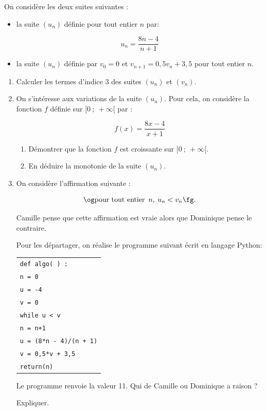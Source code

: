 \medskip

On considère les deux suites suivantes :

\setlength\parindent{9mm}
\begin{itemize}
\item[$\bullet~~$]la suite $\left(u_n\right)$ définie pour tout entier $n$ par:

\[u_n =  \dfrac{8n-4}{n+1}\]

\item[$\bullet~~$]la suite $\left(u_n\right)$ définie par $v_0 = 0$ et $v_{n+1} = 0,5v_n +3,5$ pour tout entier $n$.
\end{itemize}
\setlength\parindent{0mm}

\medskip

\begin{enumerate}
\item Calculer les termes d'indice 3 des suites $\left(u_n\right)$ et $\left(v_n\right)$.
\item On s'intéresse aux variations de la suite $\left(u_n\right)$.
 Pour cela, on considère la fonction $f$ définie sur $[0~;~+ \infty[$ par :
 
 \[f(x) = \dfrac{8x- 4}{x + 1}\]
 
	\begin{enumerate}
		\item Démontrer que la fonction $f$ est croissante sur $[0~;~+ \infty[$.
		\item En déduire la monotonie de la suite $\left(u_n\right)$.
	\end{enumerate} 
\item On considère l'affirmation suivante :

\[\og \text{pour tout entier }\, n,\: u_n < v_n \fg.\]

Camille pense que cette affirmation est vraie alors que Dominique pense le contraire.

Pour les départager, on réalise le programme suivant écrit en langage Python:

\begin{center}
\begin{tabularx}{0.5\linewidth}{|X|}\hline
\quad \texttt{def algo( )  :}\\
\quad \texttt{n = 0}\\
\quad \texttt{u = -4}\\
\quad \texttt{v = 0}\\
\quad \texttt{while u < v}\\
\qquad \texttt{n = n+1}\\
\qquad \texttt{u = (8*n - 4)/(n + 1)}\\ 
\qquad \texttt{v = 0,5*v + 3,5}\\
\quad \texttt{return(n)}\\ \hline
\end{tabularx}
\end{center}

Le programme renvoie la valeur 11. Qui de Camille ou Dominique a raison ? 

Expliquer.
\end{enumerate}

\bigskip
